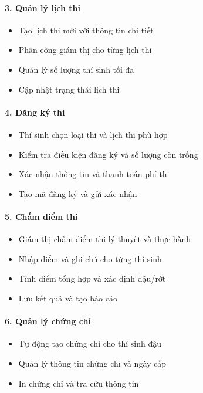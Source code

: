 \documentclass[12pt,a4paper]{article}
\begin{document}
\paragraph{3. Quản lý lịch thi}
\begin{itemize}
    \item Tạo lịch thi mới với thông tin chi tiết
    \item Phân công giám thị cho từng lịch thi
    \item Quản lý số lượng thí sinh tối đa
    \item Cập nhật trạng thái lịch thi
\end{itemize}

\paragraph{4. Đăng ký thi}
\begin{itemize}
    \item Thí sinh chọn loại thi và lịch thi phù hợp
    \item Kiểm tra điều kiện đăng ký và số lượng còn trống
    \item Xác nhận thông tin và thanh toán phí thi
    \item Tạo mã đăng ký và gửi xác nhận
\end{itemize}

\paragraph{5. Chấm điểm thi}
\begin{itemize}
    \item Giám thị chấm điểm thi lý thuyết và thực hành
    \item Nhập điểm và ghi chú cho từng thí sinh
    \item Tính điểm tổng hợp và xác định đậu/rớt
    \item Lưu kết quả và tạo báo cáo
\end{itemize}

\paragraph{6. Quản lý chứng chỉ}
\begin{itemize}
    \item Tự động tạo chứng chỉ cho thí sinh đậu
    \item Quản lý thông tin chứng chỉ và ngày cấp
    \item In chứng chỉ và tra cứu thông tin
\end{itemize}
\end{document}
